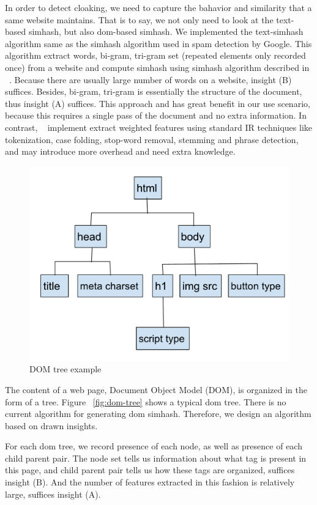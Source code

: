 In order to detect cloaking, we need to capture the bahavior and similarity that
a same website maintains. That is to say, we not only need to look at the text-based simhash,
but also dom-based simhash. We implemented the text-simhash algorithm 
same as the simhash algorithm used in spam detection by Google.
This algorithm extract words, bi-gram, tri-gram set
(repeated elements only recorded once) from a website and compute simhash using
simhash algorithm described in ~\cite{charikar2002similarity}. 
Because there are usually large number of words on a website, insight (B)
suffices. Besides, bi-gram, tri-gram is essentially the structure of the document,
thus insight (A) suffices.
This approach
and has great benefit in our use scenario, because this requires a single pass
of the document and no extra information. In contrast,
~\cite{manku2007detecting} implement extract weighted features using standard IR
techniques like tokenization, case folding, stop-word removal, stemming and
phrase detection, and may introduce more overhead and need extra knowledge.

\begin{figure}[t]
  \centering
  \includegraphics[width=.5\textwidth]{fig/dom-tree}
  \caption{DOM tree example}
  \label{fig:dom-tree}
\end{figure}

The content of a web page, Document Object Model (DOM), is organized in the form of a tree.
Figure ~\autoref{fig:dom-tree} shows a typical dom tree.
There is no current algorithm for generating dom simhash. Therefore, we design
an algorithm based on drawn insights.

For each dom tree, we record presence of each node, as
well as presence of each child parent pair. The node set tells us information about what
tag is present in this page, and child parent pair tells us how these tags are
organized, suffices insight (B). And the number of features extracted in this
fashion is relatively large, suffices insight (A).

